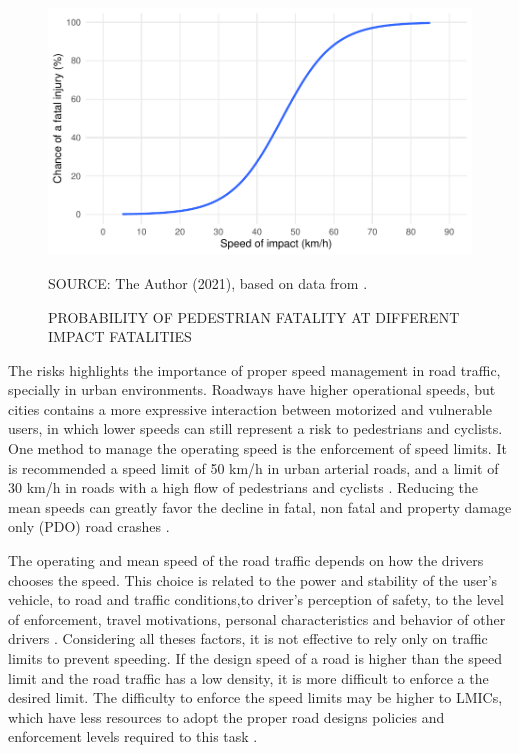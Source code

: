 \begin{figure}[!htbp]
    \centering\footnotesize
    \captionsetup{font=footnotesize}
    \caption{PROBABILITY OF PEDESTRIAN FATALITY AT DIFFERENT IMPACT FATALITIES}
    \includegraphics{fig/ash.pdf}
    \label{fig:ash}
    \par SOURCE: The Author (2021), based on data from \textcite{Ashton1980}.
\end{figure}

The risks highlights the importance of proper speed management in road traffic, specially in urban environments. Roadways have higher operational speeds, but cities contains a more expressive interaction between motorized and vulnerable users, in which lower speeds can still represent a risk to pedestrians and cyclists. One method to manage the operating speed is the enforcement of speed limits. It is recommended a speed limit of 50 km/h in urban arterial roads, and a limit of 30 km/h in roads with a high flow of pedestrians and cyclists \cite{WHO2008}. Reducing the mean speeds can greatly favor the decline in fatal, non fatal and property damage only (PDO) road crashes \cite{Elvik2013}. 

The operating and mean speed of the road traffic depends on how the drivers chooses the speed. This choice is related to the power and stability of the user's vehicle, to road and traffic conditions,to  driver's perception of safety, to the level of enforcement, travel motivations, personal characteristics and behavior of other drivers \cite{Mohan2016a, Shinar2017}. Considering all theses factors, it is not effective to rely only on traffic limits to prevent speeding. If the design speed of a road is higher than the speed limit and the road traffic has a low density, it is more difficult to enforce a the desired limit. The difficulty to enforce the speed limits may be higher to LMICs, which have less resources to adopt the proper road designs policies and enforcement levels required to this task \cite{Mohan2016a}. 

